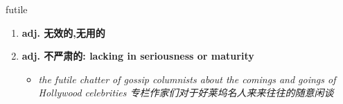 
\begin{frame}
{\huge futile}
\begin{center}
\begin{enumerate}\Large
  \item \textbf{adj. 无效的,无用的}
  \item \textbf{adj. 不严肃的: lacking in seriousness or maturity}
  \begin{itemize}
    \item \em{\Large{the futile chatter of gossip columnists about the comings and goings of Hollywood celebrities 专栏作家们对于好莱坞名人来来往往的随意闲谈}}
  \end{itemize}
\end{enumerate}
\end{center}
\end{frame}
